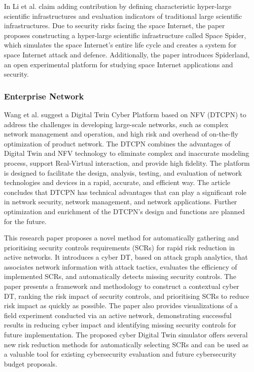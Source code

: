 In \cite{jiaqiliSpaceSpiderHyper2022} Li et al. claim adding contribution by defining characteristic hyper-large scientific infrastructures and evaluation indicators of traditional large scientific infrastructures. Due to security risks facing the space Internet, the paper proposes constructing a hyper-large scientific infrastructure called Space Spider, which simulates the space Internet's entire life cycle and creates a system for space Internet attack and defence. Additionally, the paper introduces Spiderland, an open experimental platform for studying space Internet applications and security.

\subsubsection*{Enterprise Network}
 Wang et al.\cite{wangDTCPNDigitalTwin2022} suggest a Digital Twin Cyber Platform based on NFV (DTCPN) to address the challenges in developing large-scale networks, such as complex network management and operation, and high risk and overhead of on-the-fly optimization of product network. The DTCPN combines the advantages of Digital Twin and NFV technology to eliminate complex and inaccurate modeling process, support Real-Virtual interaction, and provide high fidelity. The platform is designed to facilitate the design, analysis, testing, and evaluation of network technologies and devices in a rapid, accurate, and efficient way. The article concludes that DTCPN has technical advantages that can play a significant role in network security, network management, and network applications. Further optimization and enrichment of the DTCPN's design and functions are planned for the future.

This\cite{hadarCyberDigitalTwin2020} research paper proposes a novel method for automatically gathering and prioritising security controls requirements (SCRs) for rapid risk reduction in active networks. It introduces a cyber DT, based on attack graph analytics, that associates network information with attack tactics, evaluates the efficiency of implemented SCRs, and automatically detects missing security controls. The paper presents a framework and methodology to construct a contextual cyber DT, ranking the risk impact of security controls, and prioritising SCRs to reduce risk impact as quickly as possible. The paper also provides visualizations of a field experiment conducted via an active network, demonstrating successful results in reducing cyber impact and identifying missing security controls for future implementation. The proposed cyber Digital Twin simulator offers several new risk reduction methods for automatically selecting SCRs and can be used as a valuable tool for existing cybersecurity evaluation and future cybersecurity budget proposals.

